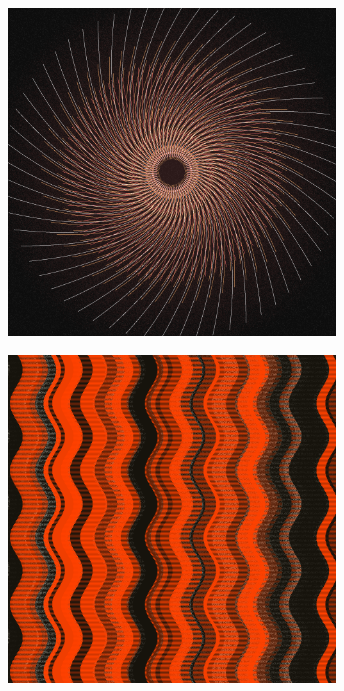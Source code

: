 \documentclass[11pt,twoside]{book}
\begin{document}
\begin{figure}[!ht]
\includegraphics[width=246pt]{salmon-lemon-d401eea0-1575-48d9-b143-558a03223929.png}
\end{figure}
\newpage
{}
\fancyfoot[CE,CO]{\fontsize{10}{12}\selectfont \thepage}
\begin{figure}[!ht]
\includegraphics[width=246pt]{contructivist-real-10d72d22-19fc-43b3-86a4-a9c598d43b31.png}
\end{figure}
\newpage
{}
\fancyfoot[CE,CO]{\fontsize{10}{12}\selectfont \thepage}
\end{document}
